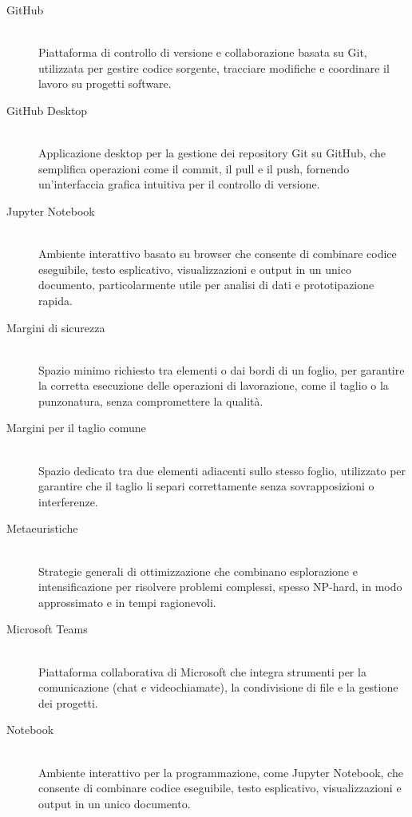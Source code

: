 \begin{description}
    \item[GitHub] \hfill \\
    Piattaforma di controllo di versione e collaborazione basata su Git, utilizzata per gestire codice sorgente, tracciare modifiche e coordinare il lavoro su progetti software.

    \item[GitHub Desktop] \hfil \\
    Applicazione desktop per la gestione dei repository Git su GitHub, che semplifica operazioni come il commit, il pull e il push, fornendo un'interfaccia grafica intuitiva per il controllo di versione.

    \item[Jupyter Notebook] \hfil \\
    Ambiente interattivo basato su browser che consente di combinare codice eseguibile, testo esplicativo, visualizzazioni e output in un unico documento, particolarmente utile per analisi di dati e prototipazione rapida.

    \item[Margini di sicurezza] \hfill \\ \hypertarget{gls2}{}
    Spazio minimo richiesto tra elementi o dai bordi di un foglio, per garantire la corretta esecuzione delle operazioni di lavorazione, come il taglio o la punzonatura, senza compromettere la qualità.

    \item[Margini per il taglio comune] \hfill \\
    Spazio dedicato tra due elementi adiacenti sullo stesso foglio, utilizzato per garantire che il taglio li separi correttamente senza sovrapposizioni o interferenze.

    \item[Metaeuristiche] \hfill \\
    Strategie generali di ottimizzazione che combinano esplorazione e intensificazione per risolvere problemi complessi, spesso NP-hard, in modo approssimato e in tempi ragionevoli.

    \item[Microsoft Teams] \hfill \\
    Piattaforma collaborativa di Microsoft che integra strumenti per la comunicazione (chat e videochiamate), la condivisione di file e la gestione dei progetti.

    \item[Notebook] \hfill \\
    Ambiente interattivo per la programmazione, come Jupyter Notebook, che consente di combinare codice eseguibile, testo esplicativo, visualizzazioni e output in un unico documento.


\end{description}
